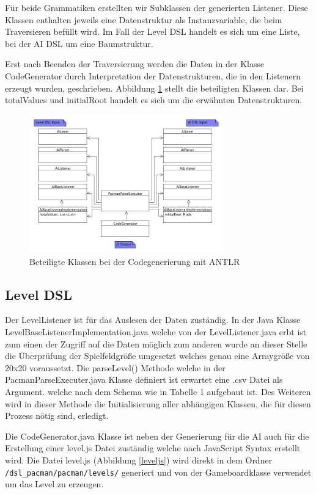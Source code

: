 \documentclass[conference]{IEEEtran}
\begin{document}
Für beide Grammatiken erstellten wir Subklassen der generierten Listener. Diese Klassen enthalten jeweils eine Datenstruktur als Instanzvariable, die beim Traversieren befüllt wird. Im Fall der Level DSL handelt es sich um eine Liste, bei der AI DSL um eine Baumstruktur.

Erst nach Beenden der Traversierung werden die Daten in der Klasse CodeGenerator durch Interpretation der Datenstrukturen, die in den Listenern erzeugt wurden, geschrieben. Abbildung \ref{antlr_classes} stellt die beteiligten Klassen dar. Bei totalValues und initialRoot handelt es sich um die erwähnten Datenstrukturen.

\begin{figure}[!htb]
\centering
\includegraphics[width=3.3in]{code_gen_rough.png}

\caption{Beteiligte Klassen bei der Codegenerierung mit ANTLR}
\label{antlr_classes}
\end{figure}

\subsection{Level DSL}
Der LevelListener ist für das Auslesen der Daten zuständig. In der Java Klasse LevelBaseListenerImplementation.java welche von der LevelListener.java erbt ist zum einen der Zugriff auf die Daten möglich zum anderen wurde an dieser Stelle die Überprüfung der Spielfeldgröße umgesetzt welches genau eine Arraygröße von 20x20 voraussetzt. Die parseLevel() Methode welche in der PacmanParseExecuter.java Klasse definiert ist erwartet eine .csv Datei als Argument. welche nach dem Schema wie in Tabelle 1 aufgebaut ist. Des Weiteren wird in dieser Methode die Initialisierung aller abhängigen Klassen, die für diesen Prozess nötig sind, erledigt.

Die CodeGenerator.java Klasse ist neben der Generierung für die AI auch für die Erstellung einer level.js Datei zuständig welche nach JavaScript Syntax erstellt wird. Die Datei level.js (Abbildung \ref{leveljs})
wird direkt in dem Ordner \texttt{/dsl\_pacman/pacman/levels/} generiert und von der Gameboardklasse verwendet um das Level zu erzeugen.
\end{document}
